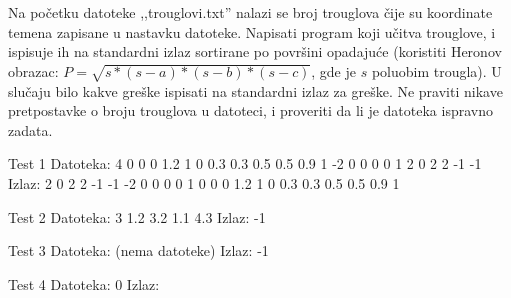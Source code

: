 \begin{Exercise}[label=905]
Na početku datoteke ,,trouglovi.txt'' nalazi se broj trouglova čije su koordinate temena zapisane u nastavku datoteke. Napisati
  program koji učitva trouglove, i ispisuje ih na standardni izlaz
  sortirane po površini opadajuće (koristiti Heronov obrazac: 
  $P = \sqrt{s*(s-a)*(s-b)*(s-c)}$, gde je $s$ poluobim trougla). U slučaju bilo kakve greške ispisati  na standardni izlaz za greške. Ne praviti nikave pretpostavke o broju trouglova u datoteci, i proveriti da li je datoteka ispravno zadata.

\begin{miditest}
\begin{test}{Test 1}
Datoteka:  4                         
           0 0 0 1.2 1 0          
           0.3 0.3 0.5 0.5 0.9 1
           -2 0 0 0 0 1
           2 0 2 2 -1 -1
Izlaz:     2 0 2 2 -1 -1             
           -2 0 0 0 0 1
           0 0 0 1.2 1 0
           0.3 0.3 0.5 0.5 0.9 1                                                   
\end{test}
\end{miditest}
\begin{minitest}
\begin{test}{Test 2}
Datoteka:  3             
          1.2 3.2 1.1 4.3
Izlaz:     -1                                            
\end{test}
\end{minitest}

\begin{miditest}
\begin{test}{Test 3}
Datoteka:   (nema datoteke)
Izlaz:     -1                                            
\end{test}
\end{miditest}
\begin{minitest}
\begin{test}{Test 4}
Datoteka:   0
Izlaz:                                                 
\end{test}
\end{minitest}

\end{Exercise}

\begin{Answer}[ref=905]
\end{Answer}


